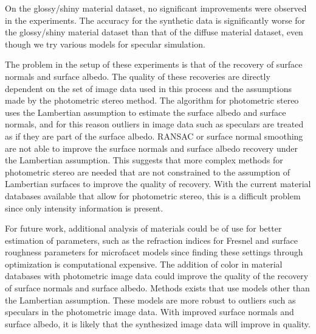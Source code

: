On the glossy/shiny material dataset, no significant improvements were observed in the experiments. The accuracy for the synthetic data is significantly worse for the glossy/shiny material dataset than that of the diffuse material dataset, even though we try various models for specular simulation.

The problem in the setup of these experiments is that of the recovery of surface normals and surface albedo. The quality of these recoveries are directly dependent on the set of image data used in this process and the assumptions made by the photometric stereo method. The algorithm for photometric stereo uses the Lambertian assumption to estimate the surface albedo and surface normals, and for this reason outliers in image data such as speculars are treated as if they are part of the surface albedo. RANSAC or surface normal smoothing are not able to improve the surface normals and surface albedo recovery under the Lambertian assumption. This suggests that more complex methods for photometric stereo are needed that are not constrained to the assumption of Lambertian surfaces to improve the quality of recovery. With the current material databases available that allow for photometric stereo, this is a difficult problem since only intensity information is present. 

For future work, additional analysis of materials could be of use for better estimation of parameters, such as the refraction indices for Fresnel and surface roughness parameters for microfacet models since finding these settings through optimization is computational expensive. The addition of color in material databases with photometric image data could improve the quality of the recovery of surface normals and surface albedo. Methods exists that use models other than the Lambertian assumption. These models are more robust to outliers such as speculars in the photometric image data. With improved surface normals and surface albedo, it is likely that the synthesized image data will improve in quality.
